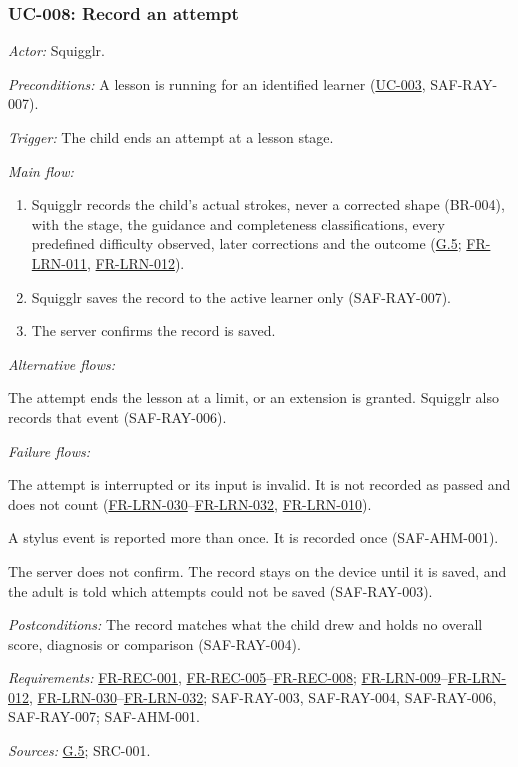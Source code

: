 \documentclass[12pt]{article}
\renewcommand{\_}{\textunderscore\allowbreak}%
\newcommand{\goalref}[1]{\hyperref[goal:#1]{G.#1}}
\newcommand{\ucref}[1]{\hyperref[uc:#1]{\mbox{UC-#1}}}
\newcommand{\reqfield}[2]{\noindent\textit{#1:} #2\par}
\newcommand{\reqref}[1]{\hyperref[req:#1]{#1}}
\providecommand{\ucref}[1]{\hyperref[uc:#1]{UC-#1}}
\begin{document}
\subsubsection{UC-008: Record an attempt}
\label{puc:008}
\reqfield{Actor}{Squigglr.}
\reqfield{Preconditions}{A lesson is running for an identified learner
(\ucref{003}, \mbox{SAF-RAY-007}).}
\reqfield{Trigger}{The child ends an attempt at a lesson stage.}
\noindent\textit{Main flow:}
\begin{enumerate}[nosep, leftmargin=2.2em]
  \item Squigglr records the child's actual strokes, never a corrected shape
  (BR-004), with the stage, the guidance and completeness classifications, every
  predefined difficulty observed, later corrections and the outcome
  (\goalref{5}; \mbox{\reqref{FR-LRN-011}}, \mbox{\reqref{FR-LRN-012}}).
  \item Squigglr saves the record to the active learner only
  (\mbox{SAF-RAY-007}).
  \item The server confirms the record is saved.
\end{enumerate}
\noindent\textit{Alternative flows:}
\begin{description}[nosep, leftmargin=2.2em, font=\normalfont]
  \item[1a.] The attempt ends the lesson at a limit, or an extension is granted.
  Squigglr also records that event (\mbox{SAF-RAY-006}).
\end{description}
\noindent\textit{Failure flows:}
\begin{description}[nosep, leftmargin=2.2em, font=\normalfont]
  \item[1b.] The attempt is interrupted or its input is invalid. It is not
  recorded as passed and does not count (\mbox{\reqref{FR-LRN-030}}--\mbox{\reqref{FR-LRN-032}},
  \mbox{\reqref{FR-LRN-010}}).
  \item[1c.] A stylus event is reported more than once. It is recorded once
  (\mbox{SAF-AHM-001}).
  \item[3a.] The server does not confirm. The record stays on the device until
  it is saved, and the adult is told which attempts could not be saved
  (\mbox{SAF-RAY-003}).
\end{description}
\reqfield{Postconditions}{The record matches what the child drew and holds no
overall score, diagnosis or comparison (\mbox{SAF-RAY-004}).}
\reqfield{Requirements}{\reqref{FR-REC-001},
\reqref{FR-REC-005}--\reqref{FR-REC-008};
\mbox{\reqref{FR-LRN-009}}--\mbox{\reqref{FR-LRN-012}}, \mbox{\reqref{FR-LRN-030}}--\mbox{\reqref{FR-LRN-032}}; \mbox{SAF-RAY-003},
\mbox{SAF-RAY-004}, \mbox{SAF-RAY-006}, \mbox{SAF-RAY-007}; \mbox{SAF-AHM-001}.}
\reqfield{Sources}{\goalref{5}; \mbox{SRC-001}.}
\end{document}
